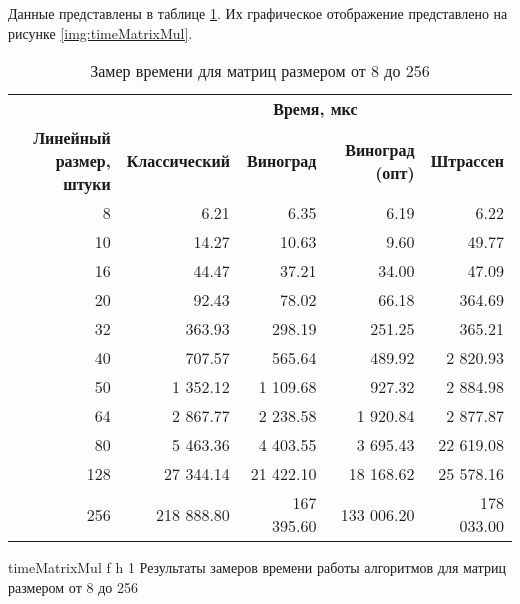 Данные представлены в таблице \ref{tbl:time}. Их графическое отображение представлено на рисунке \ref{img:timeMatrixMul}.

\begin{table}[ht]
	\small
	\begin{center}
		\begin{threeparttable}
			\caption{Замер времени для матриц размером от 8 до 256}
			\label{tbl:time}
			\begin{tabular}{|r|r|r|r|r|}
				\hline
				& \multicolumn{4}{c|}{\bfseries Время, мкс} \\ \cline{2-5}
				\bfseries \makecell{Линейный размер, \\ штуки} & \bfseries Классический & \bfseries Виноград & \bfseries Виноград (опт) & \bfseries Штрассен  \\ \cline{2-5}
				\hline
				8 & 6.21 & 6.35 & 6.19 & 6.22 \\
				\hline
				10 & 14.27 & 10.63 & 9.60 & 49.77 \\
				\hline
				16 & 44.47 & 37.21 & 34.00 & 47.09 \\
				\hline
				20 & 92.43 & 78.02 & 66.18 & 364.69 \\
				\hline
				32 & 363.93 & 298.19 & 251.25 & 365.21 \\
				\hline
				40 &  707.57 & 565.64 & 489.92 & 2 820.93 \\
				\hline
				50 & 1 352.12 & 1 109.68 & 927.32 & 2 884.98 \\
				\hline
				64 & 2 867.77 & 2 238.58 & 1 920.84 & 2 877.87 \\
				\hline
				80 & 5 463.36 & 4 403.55 & 3 695.43 & 22 619.08 \\
				\hline
				128 & 27 344.14 & 21 422.10 & 18 168.62 & 25 578.16 \\
				\hline
				256 & 218 888.80 & 167 395.60 & 133 006.20 & 178 033.00 \\
				\hline
			\end{tabular}	
		\end{threeparttable}
	\end{center}
\end{table}

\clearpage

{timeMatrixMul} %
{f} %
{h} %
{1\textwidth} %
{Результаты замеров времени работы алгоритмов для  матриц размером от 8 до 256} %

